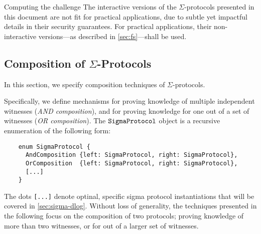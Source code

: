 \documentclass[11pt]{article}
\begin{document}
\begin{remark}{Computing the challenge}{}
  The interactive versions of the $\Sigma$-protocols presented in this document are not fit for practical applications, due to subtle yet impactful details in their security guarantees.
 For practical applications, their non-interactive versions---as described in \cref{sec:fs}---shall be used.
\end{remark}


\subsection{Composition of $\Sigma$-Protocols}
\label{sec:composition}
\label{sec:or-comp}
\label{sec:and-comp}
  In this section, we specify composition techniques of $\Sigma$-protocols.

  Specifically, we define mechanisms for proving knowledge of multiple independent witnesses (\emph{AND composition}), and for proving knowledge for one out of a set of witnesses (\emph{OR composition}). The $\texttt{SigmaProtocol}$ object is a recursive enumeration of the following form:

  \begin{verbatim}
    enum SigmaProtocol {
      AndComposition {left: SigmaProtocol, right: SigmaProtocol},
      OrComposition  {left: SigmaProtocol, right: SigmaProtocol},
      [...]
    }
  \end{verbatim}

The dots \texttt{[...]} denote optinal, specific sigma protocol instantiations that will be covered in \cref{sec:sigma-dlog}.
  Without loss of generality, the techniques presented in the following focus on the composition of two protocols;
  proving knowledge of more than two witnesses, or for out of a larger set of witnesses.
\end{document}
